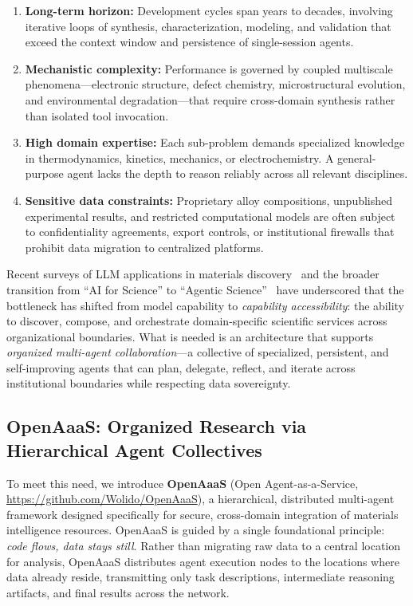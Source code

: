 \documentclass{article}
\begin{document}
\begin{enumerate}
\item \textbf{Long-term horizon:} Development cycles span years to decades, involving iterative loops of synthesis, characterization, modeling, and validation that exceed the context window and persistence of single-session agents.
\item \textbf{Mechanistic complexity:} Performance is governed by coupled multiscale phenomena---electronic structure, defect chemistry, microstructural evolution, and environmental degradation---that require cross-domain synthesis rather than isolated tool invocation.
\item \textbf{High domain expertise:} Each sub-problem demands specialized knowledge in thermodynamics, kinetics, mechanics, or electrochemistry. A general-purpose agent lacks the depth to reason reliably across all relevant disciplines.
\item \textbf{Sensitive data constraints:} Proprietary alloy compositions, unpublished experimental results, and restricted computational models are often subject to confidentiality agreements, export controls, or institutional firewalls that prohibit data migration to centralized platforms.
\end{enumerate}

Recent surveys of LLM applications in materials discovery~\cite{jiang2025npj,miret2025nmi} and the broader transition from ``AI for Science'' to ``Agentic Science''~\cite{wei2025agentic,gridach2025survey} have underscored that the bottleneck has shifted from model capability to \textit{capability accessibility}: the ability to discover, compose, and orchestrate domain-specific scientific services across organizational boundaries. What is needed is an architecture that supports \textit{organized multi-agent collaboration}---a collective of specialized, persistent, and self-improving agents that can plan, delegate, reflect, and iterate across institutional boundaries while respecting data sovereignty.

\subsection{OpenAaaS: Organized Research via Hierarchical Agent Collectives}

To meet this need, we introduce \textbf{OpenAaaS} (Open Agent-as-a-Service, \url{https://github.com/Wolido/OpenAaaS}), a hierarchical, distributed multi-agent framework designed specifically for secure, cross-domain integration of materials intelligence resources. OpenAaaS is guided by a single foundational principle: \textit{code flows, data stays still}. Rather than migrating raw data to a central location for analysis, OpenAaaS distributes agent execution nodes to the locations where data already reside, transmitting only task descriptions, intermediate reasoning artifacts, and final results across the network.
\end{document}
